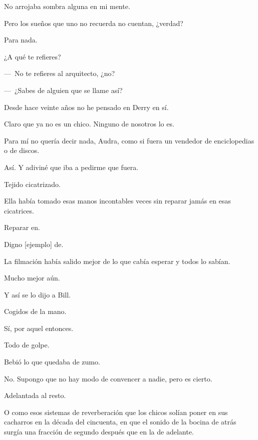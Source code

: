 \sk
No arrojaba sombra alguna en mi mente. 

\sk
Pero los sueños que uno no recuerda no cuentan, ¿verdad? \nb{}

\sk
Para nada. 

\sk
¿A qué te refieres? 

\sk
---~No te refieres al arquitecto, ¿no?

---~¿Sabes de alguien que se llame así?

\sk
Desde hace veinte años no he pensado en Derry en sí. 

\sk
Claro que ya no es un chico. Ninguno de nosotros lo es.\nb{}

\sk
Para mí no quería decir nada, Audra, como si fuera un vendedor de enciclopedias o de discos.\nb{}

\sk
 Así. Y adiviné que iba a pedirme que fuera. \nb{}

\sk
Tejido cicatrizado. 

\sk
Ella había tomado esas manos incontables veces sin reparar jamás en esas cicatrices.\nb{}

\sk
Reparar en. 

\sk
Digno [ejemplo] de. 

\sk
La filmación había salido mejor de lo que cabía esperar y todos lo sabían. 

\sk
Mucho mejor aún. 

\sk
Y así se lo dijo a Bill. 

\sk
Cogidos de la mano.\nb{}

\sk
Sí, por aquel entonces. 

\sk
Todo de golpe. 

\sk
Bebió lo que quedaba de zumo. 

\sk
No. Supongo que no hay modo de convencer a nadie, pero es cierto. 

\sk
Adelantada al resto. 

\sk
O como esos sistemas de
reverberación que los chicos solían poner en sus
cacharros en la década del cincuenta, en que el
sonido de la bocina de atrás surgía una fracción de
segundo después que en la de adelante.
\nb{}

